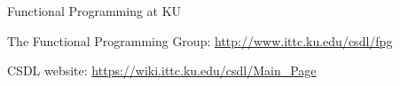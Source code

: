 \begin{hcarentry}[section]{Functional Programming at KU}
\FurtherReading
\begin{compactitem}
\item   The Functional Programming Group:
    \url{http://www.ittc.ku.edu/csdl/fpg}

\item
  CSDL website: \url{https://wiki.ittc.ku.edu/csdl/Main_Page}
\end{compactitem}
\end{hcarentry}

